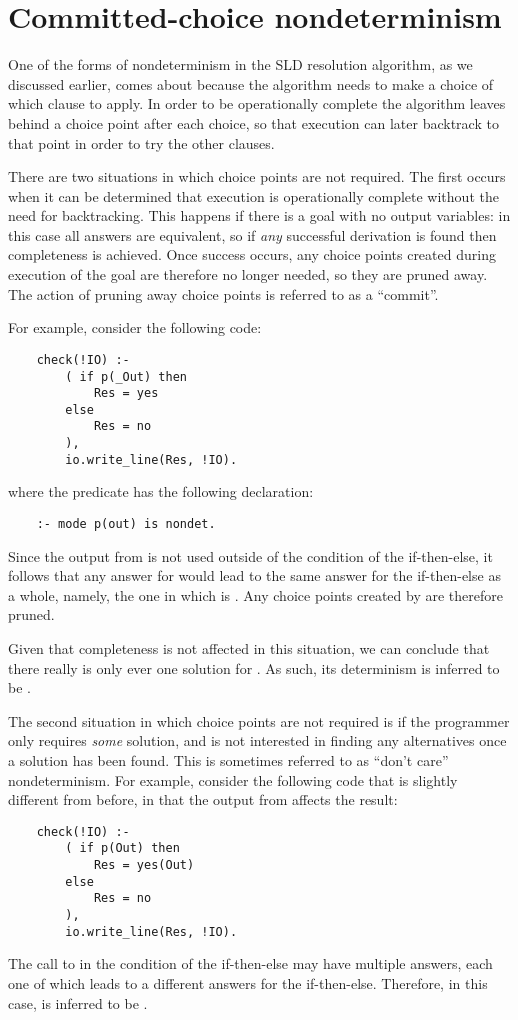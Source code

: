 \section{Committed-choice nondeterminism}
\label{sec:committed-choice}

One of the forms of nondeterminism in the SLD resolution algorithm,
as we discussed earlier,
comes about because the algorithm needs to make a choice
of which clause to apply.
In order to be operationally complete
the algorithm leaves behind a choice point after each choice,
so that execution can later backtrack to that point
in order to try the other clauses.

There are two situations in which choice points are not required.
The first occurs when it can be determined that execution is
operationally complete without the need for backtracking.
This happens if there is a goal with no output variables:
in this case all answers are equivalent,
so if \emph{any} successful derivation is found
then completeness is achieved.
Once success occurs,
any choice points created during execution of the goal
are therefore no longer needed,
so they are pruned away.
The action of pruning away choice points
is referred to as a ``commit\label{gi:commit}''.

For example, consider the following code:
\begin{verbatim}
    check(!IO) :-
        ( if p(_Out) then
            Res = yes
        else
            Res = no
        ),
        io.write_line(Res, !IO).
\end{verbatim}
where the predicate  has the following  declaration:
\begin{verbatim}
    :- mode p(out) is nondet.
\end{verbatim}
Since the output from  is not used
outside of the condition of the if-then-else,
it follows that any answer for 
would lead to the same answer for the if-then-else as a whole,
namely, the one in which  is .
Any choice points created by  are therefore pruned.

Given that completeness is not affected in this situation,
we can conclude that
there really is only ever one solution for .
As such, its determinism is inferred to be .

The second situation in which choice points are not required
is if the programmer only requires \emph{some} solution,
and is not interested in finding any alternatives
once a solution has been found.
This is sometimes referred to as ``don't care'' nondeterminism.
For example, consider the following code
that is slightly different from before,
in that the output from  affects the result:
\begin{verbatim}
    check(!IO) :-
        ( if p(Out) then
            Res = yes(Out)
        else
            Res = no
        ),
        io.write_line(Res, !IO).
\end{verbatim}
The call to  in the condition of the if-then-else
may have multiple answers,
each one of which leads to a different answers for the if-then-else.
Therefore, in this case,  is inferred to be .

